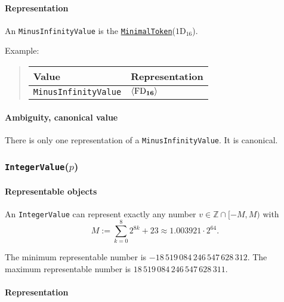 \documentclass[headings=normal, headsepline, numbers=noenddot, fleqn, a4paper]{scrartcl}
\let\mathbbm\mathds
\newcommand{\SetOfIntegers}{\mathbbm{Z}}
\newcommand{\HexNumber}[1]{\mathrm{#1}_{16}}
\newcommand{\DborSyntaxIdent}[1]{\texttt{#1}}
\newcommand{\DborSyntaxIdentRef}[1]{\hyperlink{sec:def:#1}{\DborSyntaxIdent{#1}}}
\newcommand{\DborFirstByte}[2]{\mathbf{\textcolor{#1}{\HexNumber{#2}}}}
\newcommand{\DborFirstByteNumber}[1]{\DborFirstByte{black}{#1}}
\begin{document}
    \paragraph{Representation}

    An \DborSyntaxIdent{MinusInfinityValue} is the \DborSyntaxIdentRef{MinimalToken}($\HexNumber{1D}$).

    \smallskip
    \noindent
    Example:
    \nolinebreak
    \begin{quote}    
        \begin{tabular}{ll}
            \toprule
            Value & Representation \\
            \midrule
            \DborSyntaxIdent{MinusInfinityValue} 
                & $\langle \DborFirstByteNumber{FD} \rangle$ \\
            \bottomrule
        \end{tabular}
    \end{quote}

    \paragraph{Ambiguity, canonical value}

    There is only one representation of a \DborSyntaxIdent{MinusInfinityValue}.
    It is canonical.


    \subsubsection{\DborSyntaxIdent{IntegerValue}($p$)}
    \hypertarget{sec:def:IntegerValue}{}

    \paragraph{Representable objects}

    An \DborSyntaxIdent{IntegerValue} can represent exactly any number $v \in \SetOfIntegers \cap [-M, M)$ with
    \begin{equation}
        M := \sum_{k = 0}^8 2^{8k} + 23 \approx 1.003921 \cdot 2^{64}.
    \end{equation}%

    \smallskip
    The minimum representable number is $-18\,519\,084\,246\,547\,628\,312$.
    The maximum representable number is $18\,519\,084\,246\,547\,628\,311$.

    \paragraph{Representation}
\end{document}
